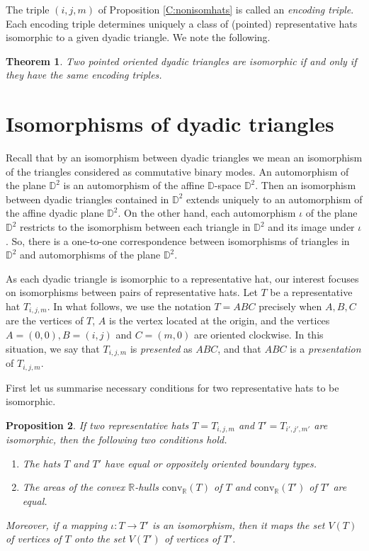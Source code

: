 \documentclass[12pt]{amsart}
\def\mr{\mathrm}
\def\mbR{\mathbb{R}}
\def\mbD{\mathbb{D}}
\theoremstyle{plain}
\newtheorem{theorem}{Theorem}[section]
\newtheorem{proposition}[theorem]{Proposition}
\theoremstyle{definition}
\numberwithin{equation}{section}
\begin{document}
The triple $(i,j,m)$ of Proposition \ref{C:nonisomhats} is called an \emph{encoding triple}. Each encoding triple determines uniquely a class of (pointed) representative hats isomorphic to a given dyadic triangle. We note the following.


\begin{theorem}\label{T:charactdyadtrs}
Two pointed oriented dyadic triangles are isomorphic if and only if they have the same encoding triples.
\end{theorem}



\section{Isomorphisms of dyadic triangles}\label{S:isomreprhats}


Recall that by an isomorphism between dyadic triangles we mean an isomorphism of the triangles
considered as commutative binary modes. An automorphism of the plane $\mbD^2$ is an automorphism
of the affine $\mbD$-space $\mbD^2$.
Then an isomorphism between dyadic triangles contained in $\mbD^2$ extends uniquely to an
automorphism of the affine dyadic plane $\mbD^2$. On the other hand, each automorphism $\iota$
of the plane $\mbD^2$ restricts to the isomorphism between each triangle in $\mbD^2$ and its
image under $\iota$. So, there is a one-to-one correspondence between isomorphisms of triangles
in $\mbD^2$ and automorphisms of the plane $\mbD^2$.

As each dyadic triangle is isomorphic to a representative hat, our interest focuses on
isomorphisms between pairs of representative hats.
Let $T$ be a representative hat $T_{i,j,m}$. In what follows, we use the notation $T = ABC$
precisely when   $A, B, C$ are the vertices of $T$, $A$ is the vertex located at the origin,
and the vertices $A = (0,0), B =
(i,j)$ and $C = (m,0)$ are oriented clockwise. In this situation, we say that $T_{i,j,m}$ is
\emph{presented} as $ABC$, and that $ABC$ is a \emph{presentation} of $T_{i,j,m}$.

First let us summarise necessary conditions for two representative hats to be isomorphic.

\begin{proposition}\cite[\S\S3,5]{MR25}\label{P:necconds}
If two representative hats $T = T_{i,j,m}$ and $T' = T_{i',j',m'}$ are isomorphic, then the
following two conditions hold.
\begin{enumerate}
\item[(a)] The hats $T$ and $T'$ have equal or oppositely oriented boundary types.
\item[(b)] The areas of the convex $\mbR$-hulls $\mr{conv}_{\mbR}(T)$ of $T$ and
    $\mr{conv}_{\mbR}(T')$ of $T'$ are equal.
\end{enumerate}
Moreover, if a mapping $\iota:T \rightarrow T'$ is an isomorphism, then it maps the set $V(T)$
of vertices of $T$ onto the set $V(T')$ of vertices of $T'$.
\end{proposition}
\end{document}
